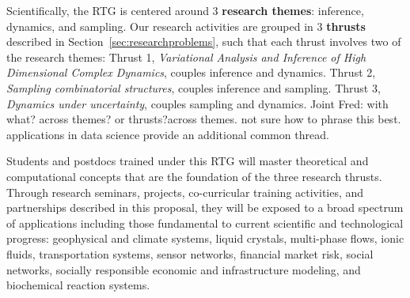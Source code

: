 \documentclass[11pt]{NSFamsart}
\newcommand{\FredNote}[1]{{\color{blue} Fred: #1}}
\begin{document}
Scientifically, the RTG is centered around 3 {\bf research themes}: inference, dynamics, and sampling. Our research activities are grouped in 3 {\bf thrusts} described in Section~\ref{sec:researchproblems}, such that each thrust involves two of the research themes: 
Thrust 1, \emph{Variational Analysis and Inference of High Dimensional Complex Dynamics}, couples inference and dynamics. 
Thrust 2, \emph{Sampling combinatorial structures}, couples inference and sampling. 
Thrust 3, \emph{Dynamics under uncertainty}, couples sampling and dynamics. 
Joint \FredNote{with what? across themes? or thrusts?}{\color{magenta}across themes. not sure how to phrase this best.}
applications in data science provide an additional common thread.  %



Students and postdocs trained under this RTG will master theoretical and computational concepts that are the foundation of the three research thrusts. Through research seminars, projects, co-curricular training activities, and partnerships described in this proposal, they will be exposed to a broad spectrum of applications including  those fundamental to current scientific and technological progress: geophysical and climate systems, liquid crystals, multi-phase flows, ionic fluids,  transportation systems, sensor networks, financial market risk, social networks, socially responsible economic and infrastructure modeling, and biochemical reaction systems.
\end{document}
